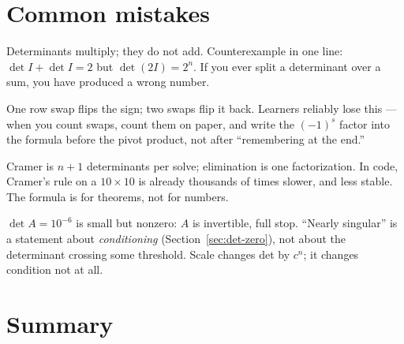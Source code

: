 \section{Common mistakes}

\begin{tripwire}
Determinants multiply; they do not add. Counterexample in one line:
$\det I+\det I=2$ but $\det(2I)=2^{n}$. If you ever split a determinant
over a sum, you have produced a wrong number.
\end{tripwire}

\begin{tripwire}
One row swap flips the sign; two swaps flip it back. Learners reliably
lose this --- when you count swaps, count them on paper, and write the
$(-1)^{s}$ factor into the formula before the pivot product, not after
``remembering at the end.''
\end{tripwire}

\begin{tripwire}
Cramer is $n+1$ determinants per solve; elimination is one factorization.
In code, Cramer's rule on a $10\times10$ is already thousands of times
slower, and less stable. The formula is for theorems, not for numbers.
\end{tripwire}

\begin{tripwire}
$\det A=10^{-6}$ is small but nonzero: $A$ is invertible, full stop.
``Nearly singular'' is a statement about \emph{conditioning}
(Section~\ref{sec:det-zero}), not about the determinant crossing some
threshold. Scale changes det by $c^{n}$; it changes condition not at all.
\end{tripwire}

\section{Summary}

